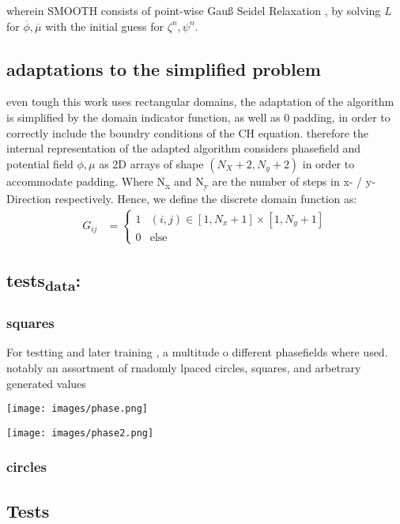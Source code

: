 \documentclass[11pt]{article}
\begin{document}
wherein SMOOTH consists of point-wise Gauß Seidel Relaxation , by solving \emph{L} for \(\overline{\phi} ,\overline{\mu}\) with the initial guess for \(\zeta^n , \psi^n\).
\subsection{adaptations to the simplified problem}
\label{sec:orgeeaf564}
even tough this work uses rectangular domains, the adaptation of the algorithm is simplified by the domain indicator function, as well as 0 padding, in order to correctly include the boundry conditions of the CH equation.
therefore the internal representation of the adapted algorithm considers phasefield and potential field \(\phi , \mu\) as 2D arrays of shape \((N_X + 2 , N_y + 2)\) in order to accommodate padding. Where N\textsubscript{x} and N\textsubscript{y} are the number of steps in x- / y-Direction respectively.
Hence, we define the discrete domain function as:
\begin{align*}
G_{ij} &=
\begin{cases}
1 & (i,j) \in  [1,N_x+1] \times  [1,N_y+1] \\
0 & \text{else}
\end{cases}
\end{align*}
\subsection{tests\textsubscript{data}:}
\label{sec:org815283c}
\subsubsection{squares}
\label{sec:org9898bf1}
For testting and later training , a multitude o different phasefields where used. notably an assortment of rnadomly lpaced circles, squares, and arbetrary generated values
\begin{center}
\texttt{[image: images/phase.png]}
\end{center}



\begin{center}
\texttt{[image: images/phase2.png]}
\end{center}
\subsubsection{circles}
\label{sec:org4aa1f6d}
\subsection{Tests}
\label{sec:orgb49f240}
\end{document}
